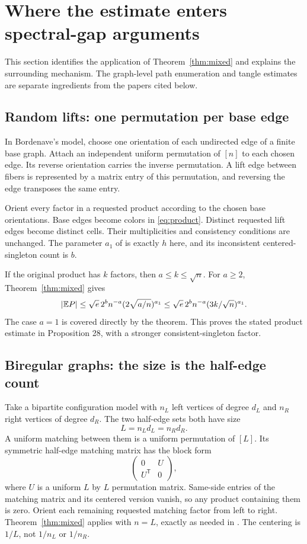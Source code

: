 \section{Where the estimate enters spectral-gap arguments}\label{sec:spectral}

This section identifies the application of Theorem~\ref{thm:mixed} and explains the surrounding mechanism. The graph-level path enumeration and tangle estimates are separate ingredients from the papers cited below.

\subsection{Random lifts: one permutation per base edge}

In Bordenave's model, choose one orientation of each undirected edge of a finite base graph. Attach an independent uniform permutation of $[n]$ to each chosen edge. Its reverse orientation carries the inverse permutation. A lift edge between fibers is represented by a matrix entry of this permutation, and reversing the edge transposes the same entry.

Orient every factor in a requested product according to the chosen base orientations. Base edges become colors in \eqref{eq:product}. Distinct requested lift edges become distinct cells. Their multiplicities and consistency conditions are unchanged. The parameter $a_1$ of \cite[Proposition 28]{Bordenave} is exactly $h$ here, and its inconsistent centered-singleton count is $b$.

If the original product has $k$ factors, then $a\le k\le\sqrt n$. For $a\ge2$, Theorem~\ref{thm:mixed} gives
\[
|\mathbb E P|\le\sqrt e\,2^bn^{-a}(2\sqrt{a/n})^{a_1}
\le\sqrt e\,2^bn^{-a}(3k/\sqrt n)^{a_1}.
\]
The case $a=1$ is covered directly by the theorem. This proves the stated product estimate in Proposition 28, with a stronger consistent-singleton factor.

\subsection{Biregular graphs: the size is the half-edge count}

Take a bipartite configuration model with $n_L$ left vertices of degree $d_L$ and $n_R$ right vertices of degree $d_R$. The two half-edge sets both have size
\[
L=n_Ld_L=n_Rd_R.
\]
A uniform matching between them is a uniform permutation of $[L]$. Its symmetric half-edge matching matrix has the block form
\[
\begin{pmatrix}0&U\\U^{\mathsf T}&0\end{pmatrix},
\]
where $U$ is a uniform $L$ by $L$ permutation matrix. Same-side entries of the matching matrix and its centered version vanish, so any product containing them is zero. Orient each remaining requested matching factor from left to right. Theorem~\ref{thm:mixed} applies with $n=L$, exactly as needed in \cite[preprint Lemma 7, published Lemma 5.6]{BDH}. The centering is $1/L$, not $1/n_L$ or $1/n_R$.

